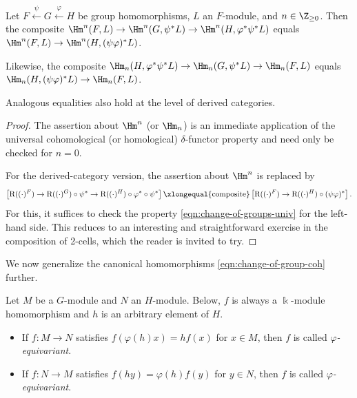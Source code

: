 \begin{lemma}\label{prop:change-of-group-compo}
	Let $F\xleftarrow{\psi}G\xleftarrow{\varphi}H$ be group homomorphisms,
	$L$ an $F$-module, and $n\in\Z_{\geq0}$. Then the composite
	$\Hm^n(F,L)\to\Hm^n(G,\psi^*L)\to
	\Hm^n(H,\varphi^*\psi^*L)$ equals
	$\Hm^n(F,L)\to\Hm^n(H,(\psi\varphi)^*L)$.

	Likewise, the composite
	$\Hm_n(H,\varphi^*\psi^*L)\to\Hm_n(G,\psi^*L)\to\Hm_n(F,L)$ equals
	$\Hm_n(H,(\psi\varphi)^*L)\to\Hm_n(F,L)$.

	Analogous equalities also hold at the level of derived categories.
\end{lemma}
\begin{proof}
	The assertion about $\Hm^n$ (or $\Hm_n$) is an immediate application of
	the universal cohomological (or homological) $\delta$-functor property
	and need only be checked for $n=0$.

	For the derived-category version, the assertion about $\Hm^n$ is replaced
	by
	\[ \left[ \mathrm{R}((\cdot)^F) \to \mathrm{R}((\cdot)^G) \circ \psi^* \to \mathrm{R}((\cdot)^H) \circ \varphi^* \circ \psi^* \right] \xlongequal{\text{composite}} \left[ \mathrm{R}((\cdot)^F) \to \mathrm{R}((\cdot)^H) \circ (\psi\varphi)^* \right]. \]
	For this, it suffices to check the property
	\eqref{eqn:change-of-groups-univ} for the left-hand side. This reduces to
	an interesting and straightforward exercise in the composition of
	2-cells, which the reader is invited to try.
\end{proof}

We now generalize the canonical homomorphisms
\eqref{eqn:change-of-group-coh} further.

\begin{definition}\label{def:group-equivariance}
	Let $M$ be a $G$-module and $N$ an $H$-module. Below, $f$ is always a
	$\Bbbk$-module homomorphism and $h$ is an arbitrary element of $H$.
	\begin{itemize}
		\item If $f:M\to N$ satisfies $f(\varphi(h)x)=hf(x)$ for $x\in M$,
		then $f$ is called \emph{$\varphi$-equivariant}.
		\item If $f:N\to M$ satisfies $f(hy)=\varphi(h)f(y)$ for $y\in N$,
		then $f$ is called \emph{$\varphi$-equivariant}.
	\end{itemize}
\end{definition}

